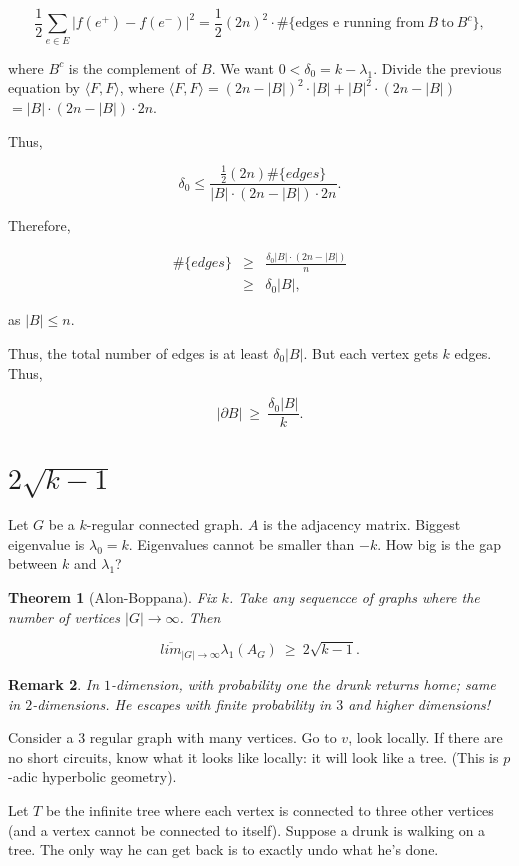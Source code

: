 \documentclass[12pt,letterpaper]{report}
\newcommand\be{\begin{equation}}
\newcommand\ee{\end{equation}}
\newcommand\bea{\begin{eqnarray}}
\newcommand\eea{\end{eqnarray}}
\newcommand{\foh}{\frac{1}{2}}  %
\newtheorem{thm}{Theorem}[section]
\newtheorem{rek}[thm]{Remark}
\begin{document}
\be \foh \sum_{e \in E} \Big| f(e^+) - f(e^-) \Big|^2 = \foh
(2n)^2 \cdot \#\{\mbox{edges e running from} \ B \ \mbox{to} \
B^c\}, \ee

where $B^c$ is the complement of $B$. We want $0 < \delta_0 = k -
\lambda_1$. Divide the previous equation by $\langle F, F\rangle$,
where $\langle F, F\rangle = (2n - |B|)^2 \cdot |B| + |B|^2
\cdot(2n - |B|)$ $= |B| \cdot (2n - |B|) \cdot 2n$.

Thus,

\be \delta_0 \le \frac{ \foh (2n) \# \{edges\} }{|B| \cdot (2n -
|B|) \cdot 2n }. \ee

Therefore,

\bea \#\{edges\} & \ge & \frac{\delta_0 |B| \cdot (2n - |B|)}{n}
\nonumber\\ & \ge & \delta_0 |B|, \eea

as $|B| \le n$.

Thus, the total number of edges is at least $\delta_0 |B|$. But
each vertex gets $k$ edges. Thus,

\be |\partial B| \ \ge \ \frac{\delta_0 |B|}{k}. \ee


\section{$2\sqrt{k-1}$}

Let $G$ be a $k$-regular connected graph. $A$ is the adjacency
matrix. Biggest eigenvalue is $\lambda_0 = k$. Eigenvalues cannot
be smaller than $-k$. How big is the gap between $k$ and
$\lambda_1$?

\begin{thm}[Alon-Boppana] Fix $k$. Take any sequencce of graphs
where the number of vertices $|G| \rightarrow \infty$. Then

\be \overline{lim}_{|G| \rightarrow \infty }  \lambda_1(A_G) \ \ge
\ 2\sqrt{k-1}. \ee
\end{thm}

\begin{rek} In $1$-dimension, with probability one the drunk
returns home; same in $2$-dimensions. He escapes with finite
probability in $3$ and higher dimensions! \end{rek}

Consider a $3$ regular graph with many vertices. Go to $v$, look
locally. If there are no short circuits, know what it looks like
locally: it will look like a tree. (This is $p$-adic hyperbolic
geometry).

Let $T$ be the infinite tree where each vertex is connected to
three other vertices (and a vertex cannot be connected to itself).
Suppose a drunk is walking on a tree. The only way he can get back
is to exactly undo what he's done.
\end{document}
